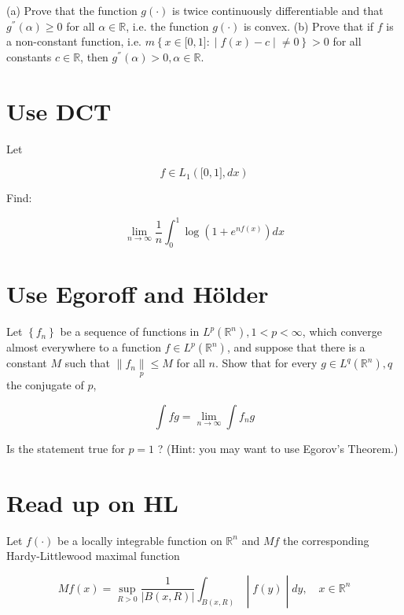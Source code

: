 (a) Prove that the function \(g( \cdot )\) is twice continuously differentiable and that \(g^{''}(\alpha) \geq 0\) for all \(\alpha \in \mathbb{R}\), i.e. the function \(g( \cdot )\) is convex. (b) Prove that if \(f\) is a non-constant function, i.e. \(m\left\{ x \in \lbrack 0,1\rbrack: \middle| f(x) - c \middle| \neq 0 \right\} > 0\) for all constants \(c \in \mathbb{R}\), then \(g^{''}(\alpha) > 0,\alpha \in \mathbb{R}\).

\chapter{Use DCT}\label{use-dct}

Let

\[f \in L_{1}(\lbrack 0,1\rbrack,dx)\]

Find:

\[\lim\limits_{n\rightarrow\infty}\frac{1}{n}\int_{0}^{1}\log\left( {1 + e^{nf(x)}} \right)dx\]



\chapter{Use Egoroff and Hölder}\label{use-egoroff-and-huxf6lder}

Let \(\left\{ f_{n} \right\}\) be a sequence of functions in \(L^{p}\left( \mathbb{R}^{n} \right),1 < p < \infty\), which converge almost everywhere to a function \(f \in L^{p}\left( \mathbb{R}^{n} \right)\), and suppose that there is a constant \(M\) such that \(\parallel f_{n}\underset{p}{\parallel} \leq M\) for all \(n\). Show that for every \(g \in L^{q}\left( \mathbb{R}^{n} \right),q\) the conjugate of \(p\),

\[\int fg = \lim\limits_{n\rightarrow\infty}\int f_{n}g\]

Is the statement true for \(p = 1\) ? (Hint: you may want to use Egorov's Theorem.)

\chapter{Read up on HL}\label{read-up-on-hl}

Let \(f( \cdot )\) be a locally integrable function on \(\mathbb{R}^{n}\) and \(Mf\) the corresponding Hardy-Littlewood maximal function

\[\left. Mf(x) = \sup\limits_{R > 0}\frac{1}{|B(x,R)|}\int_{B(x,R)} \middle| f(y) \middle| dy,\quad x \in \mathbb{R}^{n} \right.\]

